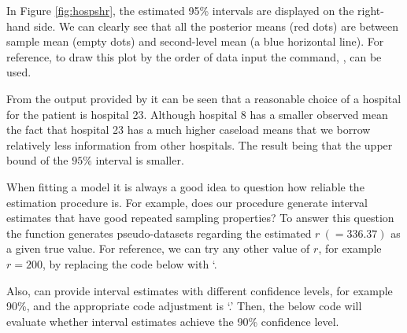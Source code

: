\documentclass[article]{jss}
\begin{document}
In Figure \ref{fig:hospshr}, the estimated 95\% intervals are displayed on the right-hand side. We can clearly see that all the posterior means (red dots) are between sample mean (empty dots) and second-level mean (a blue horizontal line). For reference, to draw this plot by the order of data input the command, , can be used.


From the output provided by  it can be seen that a reasonable choice of a hospital for the patient is hospital 23. Although hospital 8 has a smaller observed mean the fact that hospital 23 has a much higher caseload means that we borrow relatively less information from other hospitals. The result being that the upper bound of the $95\%$ interval is smaller.





When fitting a model it is always a good idea to question how reliable the estimation procedure is. For example, does our procedure generate interval estimates that have good repeated sampling properties? To answer this question the  function generates pseudo-datasets regarding the estimated $r~(=336.37)$ as a given true value. For reference, we can try any other value of $r$, for example $r=200$, by replacing the code below with `.


Also,  can provide interval estimates with different confidence levels, for example 90\%,  and the appropriate code adjustment is `.'  Then, the below code will evaluate whether interval estimates achieve the 90\% confidence level.
\end{document}
